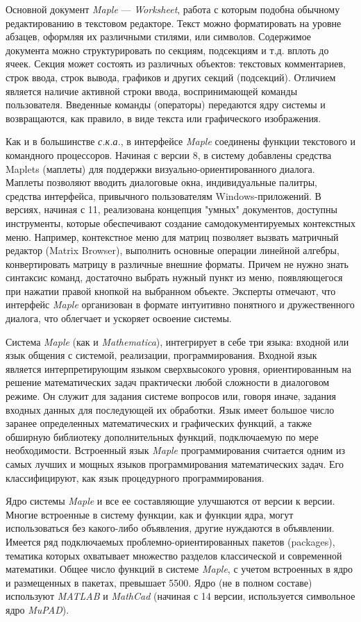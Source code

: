 Основной документ \textit{Maple} --- \textit{Worksheet}, работа с которым подобна обычному редактированию в текстовом редакторе. Текст можно форматировать на уровне абзацев, оформляя их различными стилями, или символов. Содержимое документа можно структурировать по секциям, подсекциям и т.д. вплоть до ячеек. Секция может состоять из различных объектов: текстовых комментариев, строк ввода, строк вывода, графиков и других секций (подсекций). Отличием является наличие активной строки ввода, воспринимающей команды пользователя. Введенные команды (операторы) передаются ядру системы и возвращаются, как правило, в виде текста или графического изображения. 

Как и в большинстве \textit{с.к.а.}, в интерфейсе \textit{Maple} соединены функции текстового и командного процессоров. Начиная с версии 8, в систему добавлены средства Maplets (маплеты) для поддержки визуально-ориентированного диалога. Маплеты позволяют вводить диалоговые окна, индивидуальные палитры, средства интерфейса, привычного пользователям Windows-приложений. В версиях, начиная с 11, реализована концепция "умных"{} документов, доступны инструменты, которые обеспечивают создание самодокументируемых контекстных меню. Например, контекстное меню для матриц позволяет вызвать матричный редактор (Matrix Browser), выполнить основные операции линейной алгебры, конвертировать матрицу в различные внешние форматы. Причем не нужно знать синтаксис команд, достаточно выбрать нужный пункт из меню, появляющегося при нажатии правой кнопкой на выбранном объекте. Эксперты отмечают, что интерфейс \textit{Maple} организован в формате интуитивно понятного и дружественного диалога, что облегчает и ускоряет освоение системы.

Система \textit{Maple} (как и \textit{Mathematica}), интегрирует в себе три языка: входной или язык общения с системой, реализации, программирования.
Входной язык является интерпретирующим языком сверхвысокого уровня, ориентированным на решение математических задач практически любой сложности в диалоговом режиме. Он служит для задания системе вопросов или, говоря иначе, задания входных данных для последующей их обработки. Язык имеет большое число заранее определенных математических и графических функций, а также обширную библиотеку дополнительных функций, подключаемую по мере необходимости. Встроенный язык \textit{Maple} программирования считается одним из самых лучших и мощных языков программирования математических задач. Его классифицируют, как язык процедурного программирования.

Ядро системы \textit{Maple} и все ее составляющие улучшаются от версии к версии. Многие встроенные в систему функции, как и функции ядра, могут использоваться без какого-либо объявления, другие нуждаются в объявлении. Имеется ряд подключаемых проблемно-ориентированных пакетов (packages), тематика которых охватывает множество разделов классической и современной математики. Общее число функций в системе \textit{Maple}, с учетом встроенных в ядро и размещенных в пакетах, превышает 5500. Ядро (не в полном составе) используют \textit{MATLAB} и \textit{MathCad} (начиная с 14 версии, используется символьное ядро \textit{MuPAD}).

